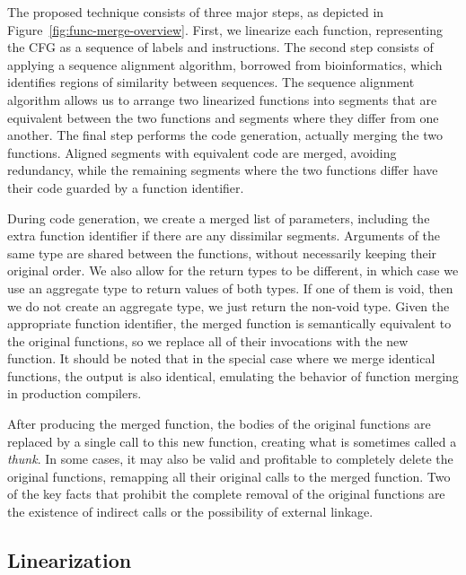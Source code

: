 The proposed technique consists of three major steps, as depicted in
Figure~\ref{fig:func-merge-overview}.
First, we linearize each function, representing the CFG as a sequence of
labels and instructions.
The second step consists of applying a sequence alignment algorithm, borrowed
from bioinformatics, which identifies regions of similarity between sequences.
The sequence alignment algorithm allows us to arrange two linearized functions
into segments that are equivalent between the two functions and segments where
they differ from one another.
The final step performs the code generation, actually merging the two functions.
Aligned segments with equivalent code are merged, avoiding redundancy, %
while the remaining segments where the two functions differ have their code guarded by a function identifier.

During code generation, we create a merged list of parameters, including the extra function identifier if there are any dissimilar segments. 
Arguments of the same type are shared between the functions, without necessarily keeping their original
order.
We also allow for the return types to be different, in which case we use an aggregate type to return values of both types.
If one of them is void, then we do not create an aggregate type, we just return the non-void type.
Given the appropriate function identifier, the merged function is semantically equivalent to the original functions,
so we replace all of their invocations with the new function.
It should be noted that in the special case where we merge identical functions, the output is also identical, emulating
the behavior of function merging in production compilers.

After producing the merged function, the bodies of the original functions are
replaced by a single call to this new function, creating what is sometimes
called a \textit{thunk}.
In some cases, it may also be valid and profitable to completely delete the
original functions, remapping all their original calls to the merged function.  
Two of the key facts that prohibit the complete removal of the original functions
are the existence of indirect calls or the possibility of external linkage.
 
\subsection{Linearization}

